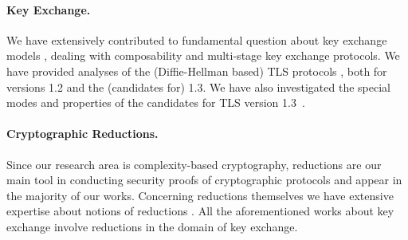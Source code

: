 \paragraph{Key Exchange.}
We have extensively contributed to fundamental question about key exchange models \cite{BFWW11,FG14}, dealing with composability and multi-stage key exchange protocols. We have provided analyses of the (Diffie-Hellman based) TLS protocols \cite{BFSWW13,DFGS15}, both for versions 1.2 and the (candidates for) 1.3. We have also investigated the special modes and properties of the candidates for TLS version 1.3~\cite{DFGS15,FGSW16}.

\paragraph{Cryptographic Reductions.}
Since our research area is complexity-based cryptography, reductions are our main tool in conducting security proofs of cryptographic protocols and appear in the majority of our works. Concerning reductions themselves we have extensive expertise about notions of reductions \cite{F12,BBF13}. All the aforementioned works about key exchange involve reductions in the domain of key exchange.
